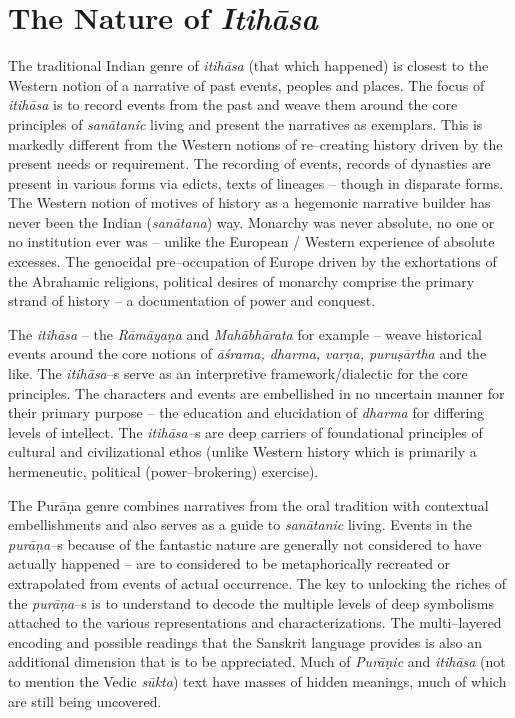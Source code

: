 \section*{The Nature of \textit{Itihāsa}}

The traditional Indian genre of \textit{itihāsa} (that which happened) is closest to the Western notion of a narrative of past events, peoples and places. The focus of \textit{itihāsa} is to record events from the past and weave them around the core principles of \textit{sanātanic} living and present the narratives as exemplars. This is markedly different from the Western notions of re–creating history driven by the present needs or requirement. The recording of events, records of dynasties are present in various forms via edicts, texts of lineages – though in disparate forms. The Western notion of motives of history as a hegemonic narrative builder has never been the Indian (\textit{sanātana}) way. Monarchy was never absolute, no one or no institution ever was – unlike the European / Western experience of absolute excesses. The genocidal pre–occupation of Europe driven by the exhortations of the Abrahamic religions, political desires of monarchy comprise the primary strand of history – a documentation of power and conquest.

The \textit{itihāsa} – the \textit{Rāmāyaṇa} and \textit{Mahābhārata} for example – weave historical events around the core notions of \textit{āśrama, dharma, varṇa, puruṣārtha} and the like. The \textit{itihāsa}–s serve as an interpretive framework/dialectic for the core principles. The characters and events are embellished in no uncertain manner for their primary purpose – the education and elucidation of \textit{dharma} for differing levels of intellect. The \textit{itihāsa–}s are deep carriers of foundational principles of cultural and civilizational ethos (unlike Western history which is primarily a hermeneutic, political (power–brokering) exercise).

The Purāṇa genre combines narratives from the oral tradition with contextual embellishments and also serves as a guide to \textit{sanātanic} living. Events in the \textit{purāṇa–}s because of the fantastic nature are generally not considered to have actually happened – are to considered to be metaphorically recreated or extrapolated from events of actual occurrence. The key to unlocking the riches of the \textit{purāṇa}–s is to understand to decode the multiple levels of deep symbolisms attached to the various representations and characterizations. The multi–layered encoding and possible readings that the Sanskrit language provides is also an additional dimension that is to be appreciated. Much of \textit{Purāṇic} and \textit{itihāsa} (not to mention the Vedic \textit{sūkta}) text have masses of hidden meanings, much of which are still being uncovered.


